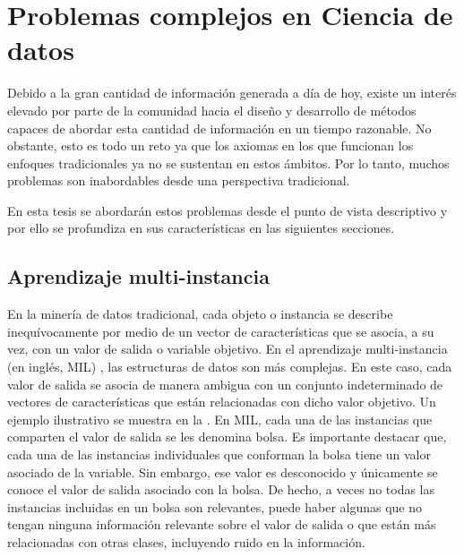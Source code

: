 \documentclass[c5paper,10pt,twoside]{book}	   	%
\begin{document}
\section{Problemas complejos en Ciencia de datos} \label{sec:complejos}

Debido a la gran cantidad de información generada a día de hoy, existe un interés elevado por parte de la comunidad hacia el diseño y desarrollo de métodos capaces de abordar esta cantidad de información en un tiempo razonable. No obstante, esto es todo un reto ya que los axiomas en los que funcionan los enfoques tradicionales ya no se sustentan en estos ámbitos. Por lo tanto, muchos problemas son inabordables desde una perspectiva tradicional.

En esta tesis se abordarán estos problemas desde el punto de vista descriptivo y por ello se profundiza en sus características en las siguientes secciones.

\subsection{Aprendizaje multi-instancia} \label{sec:MIL_BG}



En la minería de datos tradicional, cada objeto o instancia se describe inequívocamente por medio de un vector de características que se asocia, a su vez, con un valor de salida o variable objetivo. En el aprendizaje multi-instancia (en inglés, \ac{MIL}) \cite{HerreraVBCZSV16}, las estructuras de datos son más complejas. En este caso, cada valor de salida se asocia de manera ambigua con un conjunto indeterminado de vectores de características que están relacionadas con dicho valor objetivo. Un ejemplo ilustrativo se muestra en la . En \ac{MIL}, cada una de las instancias que comparten el valor de salida se les denomina bolsa. Es importante destacar que, cada una de las instancias individuales que conforman la bolsa tiene un valor asociado de la variable. Sin embargo, ese valor es desconocido y únicamente se conoce el valor de salida asociado con la bolsa. De hecho, a veces no todas las instancias incluidas en un bolsa son relevantes, puede haber algunas que no tengan ninguna información relevante sobre el valor de salida o que están más relacionadas con otras clases, incluyendo ruido en la información. 
\end{document}
